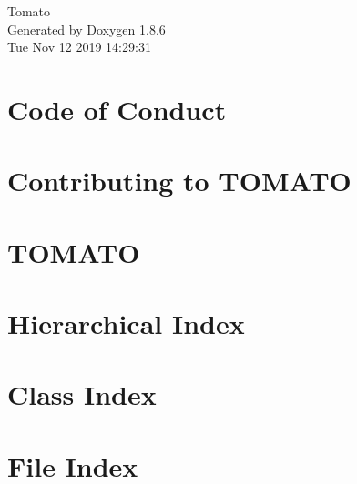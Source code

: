 \documentclass[twoside]{book}
\newcommand{\clearemptydoublepage}{%
  \newpage{\pagestyle{empty}\cleardoublepage}%
}
\begin{document}
\hypersetup{pageanchor=false}
\begin{titlepage}
\vspace*{7cm}
\begin{center}%
{\Large Tomato }\\
\vspace*{1cm}
{\large Generated by Doxygen 1.8.6}\\
\vspace*{0.5cm}
{\small Tue Nov 12 2019 14:29:31}\\
\end{center}
\end{titlepage}
\clearemptydoublepage
\tableofcontents
\clearemptydoublepage
{}
\hypersetup{pageanchor=true}

\chapter{Code of Conduct}
\label{md_codeofconduct}
\hypertarget{md_codeofconduct}{}

\chapter{Contributing to T\-O\-M\-A\-T\-O}
\label{md_contributing}
\hypertarget{md_contributing}{}

\chapter{T\-O\-M\-A\-T\-O}
\label{md__r_e_a_d_m_e}
\hypertarget{md__r_e_a_d_m_e}{}

\chapter{Hierarchical Index}

\chapter{Class Index}

\chapter{File Index}

\end{document}
